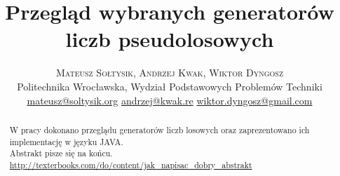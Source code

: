 \documentclass[twoside]{article}
\title{\vspace{-15mm}\fontsize{24pt}{10pt}\selectfont\textbf{Przegląd wybranych generatorów liczb pseudolosowych}} %
\author{
\large
\textsc{Mateusz Sołtysik, Andrzej Kwak, Wiktor Dyngosz} \vspace{2mm} \\ %
\normalsize Politechnika Wrocławska, Wydział Podstawowych Problemów Techniki \vspace{2mm} \\ %
\normalsize
\href{mailto:mateusz@soltysik.org}{mateusz@soltysik.org} \hspace{1mm} %
\href{mailto:andrzej@kwak.re}{andrzej@kwak.re} \hspace{1mm} %
\href{mailto:wiktor.dyngosz@gmail.com}{wiktor.dyngosz@gmail.com} \\ %
}
\date{}
\begin{document}
\maketitle %

\thispagestyle{fancy} %


\begin{abstract}

\noindent W pracy dokonano przeglądu generatorów liczb losowych oraz zaprezentowano ich implementację w języku JAVA. 
\\Abstrakt pisze się na końcu. 
\url{http://texterbooks.com/do/content/jak_napisac_dobry_abstrakt}
\end{abstract}

\end{document}
